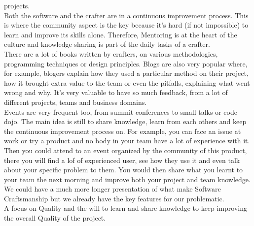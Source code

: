 projects.\\
\newline
Both the software and the crafter are in a continuous improvement process.
This is where the community aspect is the key because it's hard (if not
impossible) to learn and improve its skills alone.
Therefore, Mentoring is at the heart of the culture and knowledge sharing is
part of the daily tasks of a crafter. \\
\newline
There are a lot of books written by crafters, on various methodologies,
programming techniques or design principles.
Blogs are also very popular where, for example, blogers explain how they
used a particular method on their project, how it brought extra value to
the team or even the pitfalls, explaining what went wrong and why.
It's very valuable to have so much feedback, from a lot of different
projects, teams and business domains. \\
\newline
Events are very frequent too, from summit conferences to small talks or
code dojo.
The main idea is still to share knowledge, learn from each others and keep
the continuous improvement process on.
For example, you can face an issue at work or try a product and no body
in your team have a lot of experience with it.
Then you could attend to an event organized by the community of this product,
there you will find a lof of experienced user, see how they use it and even
talk about your specific problem to them.
You would then share what you learnt to your team the next morning and
improve both your project and team knowledge. \\
\newline
We could have a much more longer presentation of what make Software
Craftsmanship but we already have the key features for our problematic. \\
A focus on Quality and the will to learn and share knowledge to keep
improving the overall Quality of the project.
